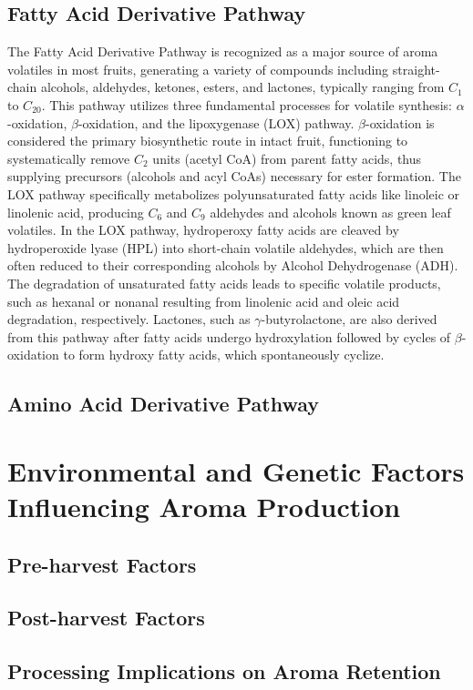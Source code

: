 \subsection{Fatty Acid Derivative Pathway}
The Fatty Acid Derivative Pathway is recognized as a major source of aroma volatiles in most fruits, generating a variety of compounds including straight-chain alcohols, aldehydes, ketones, esters, and lactones, typically ranging from $C_1$ to $C_{20}$. This pathway utilizes three fundamental processes for volatile synthesis: $\alpha$-oxidation, $\beta$-oxidation, and the lipoxygenase (LOX) pathway. $\beta$-oxidation is considered the primary biosynthetic route in intact fruit, functioning to systematically remove $C_2$ units (acetyl CoA) from parent fatty acids, thus supplying precursors (alcohols and acyl CoAs) necessary for ester formation. The LOX pathway specifically metabolizes polyunsaturated fatty acids like linoleic or linolenic acid, producing $C_6$ and $C_9$ aldehydes and alcohols known as green leaf volatiles. In the LOX pathway, hydroperoxy fatty acids are cleaved by hydroperoxide lyase (HPL) into short-chain volatile aldehydes, which are then often reduced to their corresponding alcohols by Alcohol Dehydrogenase (ADH). The degradation of unsaturated fatty acids leads to specific volatile products, such as hexanal or nonanal resulting from linolenic acid and oleic acid degradation, respectively. Lactones, such as $\gamma$-butyrolactone, are also derived from this pathway after fatty acids undergo hydroxylation followed by cycles of $\beta$-oxidation to form hydroxy fatty acids, which spontaneously cyclize.

\subsection{Amino Acid Derivative Pathway}


\section{Environmental and Genetic Factors Influencing Aroma Production}
\subsection{Pre-harvest Factors}
\subsection{Post-harvest Factors}
\subsection{Processing Implications on Aroma Retention}


